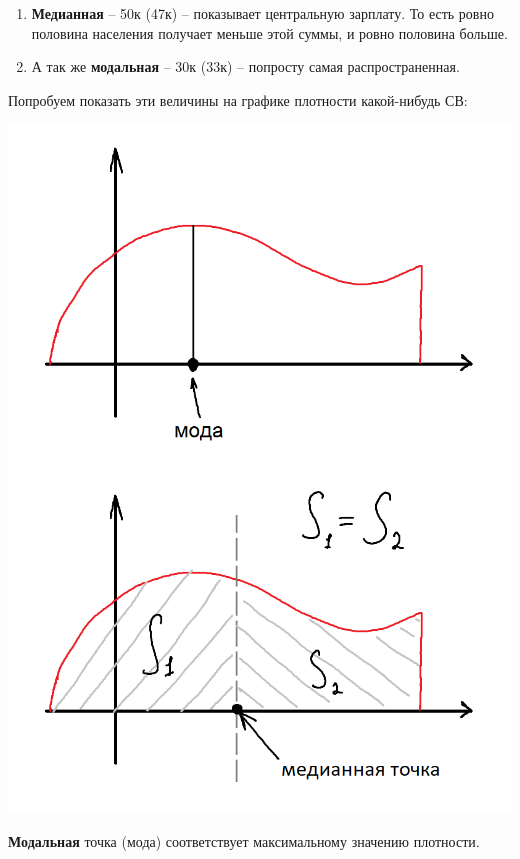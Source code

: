 \documentclass{article}
\begin{document}
\begin{enumerate}
\item \textbf{Медианная} -- 50к (47к) -- показывает центральную зарплату. То есть ровно половина населения получает меньше этой суммы, и ровно половина больше. 

\item А так же \textbf{модальная} -- 30к (33к) -- попросту самая распространенная. 
\end{enumerate}

Попробуем показать эти величины на графике плотности какой-нибудь СВ:

\begin{center}
    \includegraphics[scale=0.33]{2.png}
    \includegraphics[scale=0.33]{3.png}
\end{center}

\textbf{Модальная} точка (мода) соответствует максимальному значению плотности.
\end{document}

